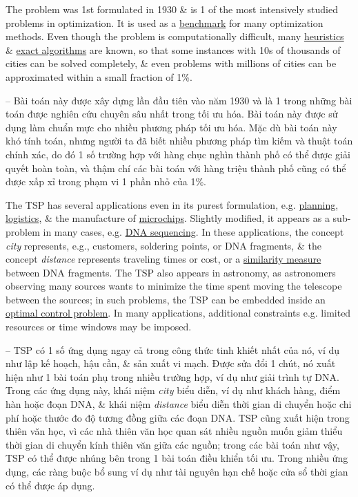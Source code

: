 \documentclass{article}
\begin{document}
The problem was 1st formulated in 1930 \& is 1 of the most intensively studied problems in optimization. It is used as a \href{https://en.wikipedia.org/wiki/Benchmark_(computing)}{benchmark} for many optimization methods. Even though the problem is computationally difficult, many \href{https://en.wikipedia.org/wiki/Heuristic}{heuristics} \& \href{https://en.wikipedia.org/wiki/Exact_algorithm}{exact algorithms} are known, so that some instances with 10s of thousands of cities can be solved completely, \& even problems with millions of cities can be approximated within a small fraction of 1\%.

-- Bài toán này được xây dựng lần đầu tiên vào năm 1930 và là 1 trong những bài toán được nghiên cứu chuyên sâu nhất trong tối ưu hóa. Bài toán này được sử dụng làm chuẩn mực cho nhiều phương pháp tối ưu hóa. Mặc dù bài toán này khó tính toán, nhưng người ta đã biết nhiều phương pháp tìm kiếm và thuật toán chính xác, do đó 1 số trường hợp với hàng chục nghìn thành phố có thể được giải quyết hoàn toàn, và thậm chí các bài toán với hàng triệu thành phố cũng có thể được xấp xỉ trong phạm vi 1 phần nhỏ của 1\%.

The TSP has several applications even in its purest formulation, e.g. \href{https://en.wikipedia.org/wiki/Planning}{planning}, \href{https://en.wikipedia.org/wiki/Logistics}{logistics}, \& the manufacture of \href{https://en.wikipedia.org/wiki/Integrated_circuit}{microchips}. Slightly modified, it appears as a sub-problem in many cases, e.g. \href{https://en.wikipedia.org/wiki/DNA_sequencing}{DNA sequencing}. In these applications, the concept {\it city} represents, e.g., customers, soldering points, or DNA fragments, \& the concept {\it distance} represents traveling times or cost, or a \href{https://en.wikipedia.org/wiki/Similarity_measure}{similarity measure} between DNA fragments. The TSP also appears in astronomy, as astronomers observing many sources wants to minimize the time spent moving the telescope between the sources; in such problems, the TSP can be embedded inside an \href{https://en.wikipedia.org/wiki/Optimal_control}{optimal control problem}. In many applications, additional constraints e.g. limited resources or time windows may be imposed.

-- TSP có 1 số ứng dụng ngay cả trong công thức tinh khiết nhất của nó, ví dụ như lập kế hoạch, hậu cần, \& sản xuất vi mạch. Được sửa đổi 1 chút, nó xuất hiện như 1 bài toán phụ trong nhiều trường hợp, ví dụ như giải trình tự DNA. Trong các ứng dụng này, khái niệm {\it city} biểu diễn, ví dụ như khách hàng, điểm hàn hoặc đoạn DNA, \& khái niệm {\it distance} biểu diễn thời gian di chuyển hoặc chi phí hoặc thước đo độ tương đồng giữa các đoạn DNA. TSP cũng xuất hiện trong thiên văn học, vì các nhà thiên văn học quan sát nhiều nguồn muốn giảm thiểu thời gian di chuyển kính thiên văn giữa các nguồn; trong các bài toán như vậy, TSP có thể được nhúng bên trong 1 bài toán điều khiển tối ưu. Trong nhiều ứng dụng, các ràng buộc bổ sung ví dụ như tài nguyên hạn chế hoặc cửa sổ thời gian có thể được áp dụng.
\end{document}

